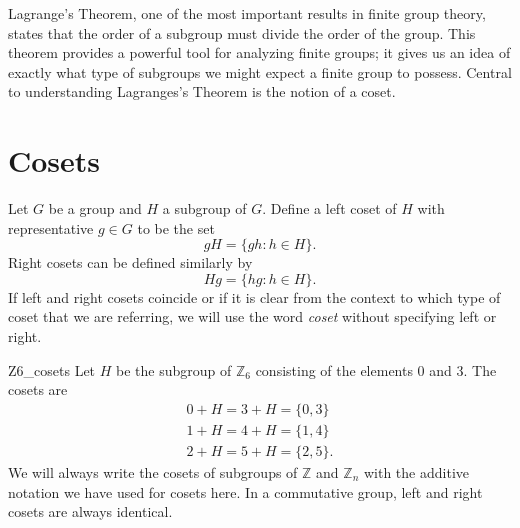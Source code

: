 

Lagrange's Theorem, one of the most important results in finite group theory, states that the order of a subgroup must divide the order of the group.  This theorem provides a powerful tool for analyzing finite groups; it gives us an idea of exactly what type of subgroups we might expect a finite group to possess.  Central to understanding Lagranges's Theorem is the notion of a coset.


\section{Cosets}

Let $G$ be a group and $H$ a subgroup of $G$.  Define a {\bfi left  coset\/} of $H$ with {\bfi  representative} $g \in G$ to be the set 
\[
gH = \{ gh : h \in H \}.
\]
{\bfi Right cosets\/} can be defined similarly by
\[
Hg = \{ hg : h \in H \}.
\]
If left and right cosets coincide or if it is clear from the context to which type of coset that we are referring, we will use the word {\em coset\/} without specifying left or right. 

\begin{example}{Z6_cosets}
Let $H$ be the subgroup of ${\mathbb Z}_6$ consisting of the elements 0 and 3.  The cosets are 
\begin{gather*}
0 + H = 3 + H = \{ 0, 3 \} \\
1 + H = 4 + H = \{ 1, 4 \} \\
2 + H = 5 + H = \{ 2, 5 \}.
\end{gather*}
We will always write the cosets of subgroups of ${\mathbb Z}$ and ${\mathbb Z}_n$ with the additive notation we have used for cosets here.  In a commutative group, left and right cosets are always identical. 
\end{example}

